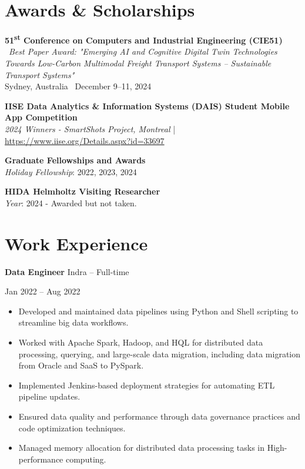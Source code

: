 \documentclass[10pt, letterpaper]{article}
\newenvironment{highlights}{
    \begin{itemize}[
        topsep=0.10 cm,
        parsep=0.10 cm,
        partopsep=0pt,
        itemsep=0pt,
        leftmargin=0 cm + 10pt
    ]
}{
    \end{itemize}
} %
\newenvironment{twocolentry}[2][]{
    \onecolentry
    \def\secondColumn{#2}
    \setcolumnwidth{\fill, 4.5 cm}
    \begin{paracol}{2}
}{
    \switchcolumn \raggedleft \secondColumn
    \end{paracol}
    \endonecolentry
} %
\begin{document}
    \section*{Awards \& Scholarships}


    \noindent \textbf{51\textsuperscript{st} Conference on Computers and Industrial Engineering (CIE51)} \ \textit{Best Paper Award: "Emerging AI and Cognitive Digital Twin Technologies Towards Low-Carbon Multimodal Freight Transport Systems – Sustainable Transport Systems"} \\ Sydney, Australia \  December 9–11, 2024 \
    \vspace{0.5em}


     
    \noindent \textbf{IISE Data Analytics \& Information Systems (DAIS) Student Mobile App Competition} \\
    \textit{2024 Winners - SmartShots Project, Montreal} | \url{https://www.iise.org/Details.aspx?id=33697}\\
    
    
 
    \vspace{0.5em} %
    
    \noindent \textbf{Graduate Fellowships and Awards} \\
    \textit{Holiday Fellowship}: 2022, 2023, 2024 \\
    
    \vspace{0.5em} %
    
    \noindent \textbf{HIDA Helmholtz Visiting Researcher} \\
    \textit{Year}: 2024 - Awarded but not taken.

        
\section*{Work Experience}

\begin{twocolentry}{Jan 2022 – Aug 2022}
    \textbf{Data Engineer} \textbar Indra – Full-time
\end{twocolentry}
\begin{highlights}
    \item Developed and maintained data pipelines using Python and Shell scripting to streamline big data workflows.
    \item Worked with Apache Spark, Hadoop, and HQL for distributed data processing, querying, and large-scale data migration, including data migration from Oracle and SaaS to PySpark.
    \item Implemented Jenkins-based deployment strategies for automating ETL pipeline updates.
    \item Ensured data quality and performance through data governance practices and code optimization techniques.
    \item Managed memory allocation for distributed data processing tasks in High-performance computing.
\end{highlights}
\end{document}
